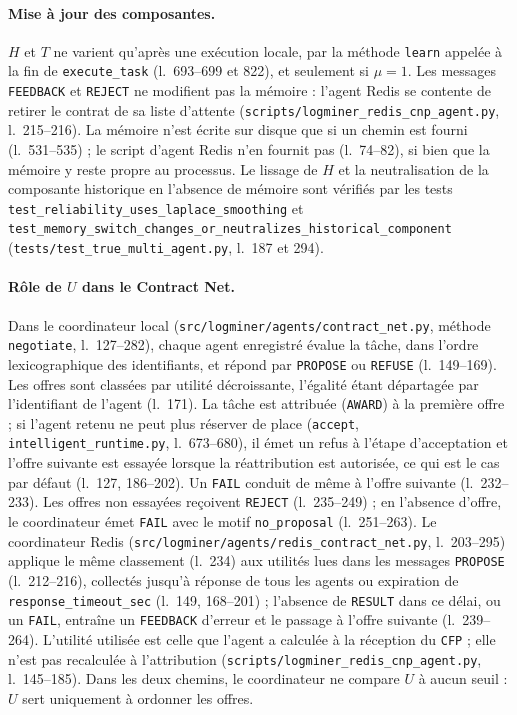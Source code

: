\paragraph{Mise à jour des composantes.}
$H$ et $T$ ne varient qu'après une exécution locale, par la méthode
\texttt{learn} appelée à la fin de \texttt{execute\_task}
(l.~693--699 et 822), et seulement si $\mu = 1$. Les messages
\texttt{FEEDBACK} et \texttt{REJECT} ne modifient pas la mémoire : l'agent
Redis se contente de retirer le contrat de sa liste d'attente
(\texttt{scripts/logminer\_redis\_cnp\_agent.py}, l.~215--216). La mémoire
n'est écrite sur disque que si un chemin est fourni (l.~531--535) ; le script
d'agent Redis n'en fournit pas (l.~74--82), si bien que la mémoire y reste
propre au processus. Le lissage de $H$ et la neutralisation de la composante
historique en l'absence de mémoire sont vérifiés par les tests
\texttt{test\_reliability\_uses\_laplace\_smoothing} et
\texttt{test\_memory\_switch\_changes\_or\_neutralizes\_historical\_component}
(\texttt{tests/test\_true\_multi\_agent.py}, l.~187 et 294).

\paragraph{Rôle de $U$ dans le Contract Net.}
Dans le coordinateur local (\texttt{src/logminer/agents/contract\_net.py},
méthode \texttt{negotiate}, l.~127--282), chaque agent enregistré évalue la
tâche, dans l'ordre lexicographique des identifiants, et répond par
\texttt{PROPOSE} ou \texttt{REFUSE} (l.~149--169). Les offres sont classées
par utilité décroissante, l'égalité étant départagée par l'identifiant de
l'agent (l.~171). La tâche est attribuée (\texttt{AWARD}) à la première
offre ; si l'agent retenu ne peut plus réserver de place
(\texttt{accept}, \texttt{intelligent\_runtime.py}, l.~673--680), il émet un
refus à l'étape d'acceptation et l'offre suivante est essayée lorsque la
réattribution est autorisée, ce qui est le cas par défaut (l.~127, 186--202).
Un \texttt{FAIL} conduit de même à l'offre suivante (l.~232--233). Les offres
non essayées reçoivent \texttt{REJECT} (l.~235--249) ; en l'absence d'offre,
le coordinateur émet \texttt{FAIL} avec le motif \texttt{no\_proposal}
(l.~251--263). Le coordinateur Redis
(\texttt{src/logminer/agents/redis\_contract\_net.py}, l.~203--295) applique
le même classement (l.~234) aux utilités lues dans les messages
\texttt{PROPOSE} (l.~212--216), collectés jusqu'à réponse de tous les agents
ou expiration de \texttt{response\_timeout\_sec} (l.~149, 168--201) ;
l'absence de \texttt{RESULT} dans ce délai, ou un \texttt{FAIL}, entraîne un
\texttt{FEEDBACK} d'erreur et le passage à l'offre suivante (l.~239--264).
L'utilité utilisée est celle que l'agent a calculée à la réception du
\texttt{CFP} ; elle n'est pas recalculée à l'attribution
(\texttt{scripts/logminer\_redis\_cnp\_agent.py}, l.~145--185). Dans les deux
chemins, le coordinateur ne compare $U$ à aucun seuil : $U$ sert uniquement à
ordonner les offres.

